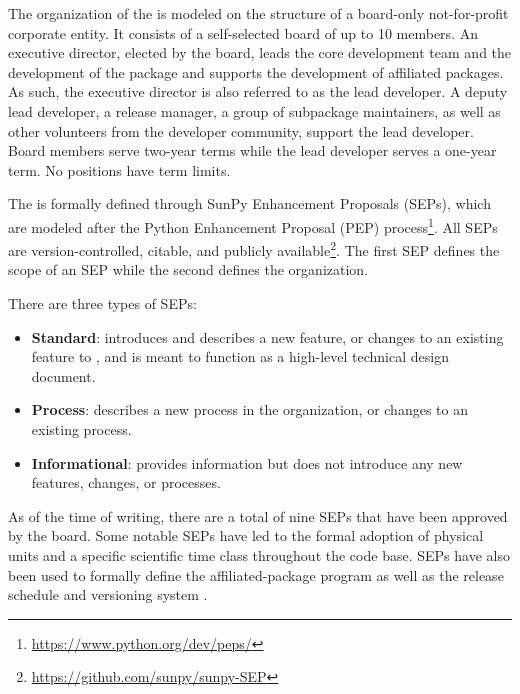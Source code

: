 The organization of the \sunpyproj is modeled on the structure of a board-only not-for-profit corporate entity.
It consists of a self-selected board of up to 10 members.
An executive director, elected by the board, leads the core development team and the development of the \sunpypkg  package and supports the development of affiliated packages.
As such, the executive director is also referred to as the lead developer.
A deputy lead developer, a release manager, a group of subpackage maintainers, as well as other volunteers from the developer community, support the lead developer.
Board members serve two-year terms while the lead developer serves a one-year term.
No positions have term limits.

The \sunpyproj is formally defined through SunPy Enhancement Proposals (SEPs), which are modeled after the Python Enhancement Proposal (PEP) process\footnote{\url{https://www.python.org/dev/peps/}}.
All SEPs are version-controlled, citable, and publicly available\footnote{\url{https://github.com/sunpy/sunpy-SEP}}.
The first SEP \citep[SEP-0001,][]{sep-0001} defines the scope of an SEP \citep[similar to][]{ape-0001} while the second \citep[SEP-0002,][]{sep-0002} defines the  \sunpyproj organization.

There are three types of SEPs:
\begin{itemize}
    \item \textbf{Standard}: introduces and describes a new feature, or changes to an existing feature to \sunpypkg, and is meant to function as a high-level technical design document.
    \item \textbf{Process}: describes a new process in the organization, or changes to an existing process.
    \item \textbf{Informational}: provides information but does not introduce any new features, changes, or processes.
\end{itemize}

As of the time of writing, there are a total of nine SEPs that have been approved by the board.
Some notable SEPs have led to the formal adoption of physical units \citep[SEP-0003,][see \autoref{sec:units}]{sep-0003} and a specific scientific time class \citep[SEP-0008,][see \autoref{sec:units}]{sep-0008} throughout the code base.
SEPs have also been used to formally define the affiliated-package program \citep[SEP-0004,][see \autoref{sec:affil_package}]{sep-0004} as well as the release schedule and versioning system \citep[SEP-0009,][see \autoref{sec:release}]{sep-0009}.
